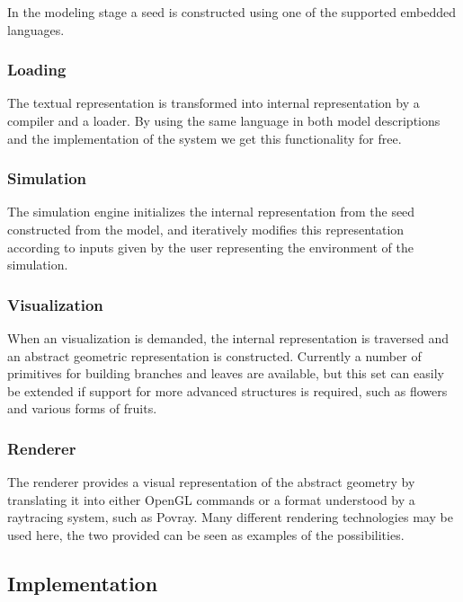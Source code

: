     In the modeling stage a seed is constructed using one of the
    supported embedded languages.


\subsubsection{Loading}


    The textual representation is transformed into internal
    representation by a compiler and a loader. By using the same language
    in both model descriptions and the implementation of the
    system we get this functionality for free.


\subsubsection{Simulation}

   The simulation engine initializes the internal representation from
   the seed constructed from the model, and iteratively modifies this
   representation according to inputs given by the user representing
   the environment of the simulation.


\subsubsection{Visualization}

    When an visualization is demanded, the internal representation is
    traversed and an abstract geometric representation is constructed. 
    Currently a number of primitives for building
    branches and leaves are available, but this set can easily be
    extended if support for more advanced structures is required, such
    as flowers and various forms of fruits.

\label{system:geomrep}


\subsubsection{Renderer}

    The renderer provides a visual representation of the abstract
    geometry by translating it into either OpenGL commands or a format
    understood by a raytracing system, such as Povray. Many different
    rendering technologies may be used here, the two provided can be
    seen as examples of the possibilities.


\subsection{Implementation}

